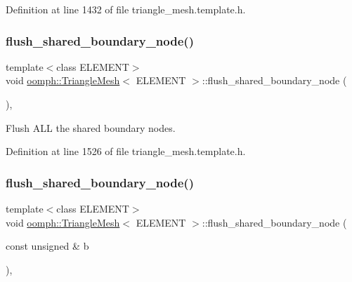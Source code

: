 Definition at line 1432 of file triangle\+\_\+mesh.\+template.\+h.

\mbox{\label{classoomph_1_1TriangleMesh_addbb476c72cce6f9d190d6bc026edbf0}} 
\subsubsection{\texorpdfstring{flush\+\_\+shared\+\_\+boundary\+\_\+node()}{flush\_shared\_boundary\_node()}\hspace{0.1cm}{\footnotesize\ttfamily [1/2]}}
{\footnotesize\ttfamily template$<$class E\+L\+E\+M\+E\+NT$>$ \\
void \hyperlink{classoomph_1_1TriangleMesh}{oomph\+::\+Triangle\+Mesh}$<$ E\+L\+E\+M\+E\+NT $>$\+::flush\+\_\+shared\+\_\+boundary\+\_\+node (\begin{DoxyParamCaption}{ }\end{DoxyParamCaption})\hspace{0.3cm}{\ttfamily [inline]}, {\ttfamily [protected]}}



Flush A\+LL the shared boundary nodes. 



Definition at line 1526 of file triangle\+\_\+mesh.\+template.\+h.

\mbox{\label{classoomph_1_1TriangleMesh_a23d348f815de7eee301395bbda9a0adf}} 
\subsubsection{\texorpdfstring{flush\+\_\+shared\+\_\+boundary\+\_\+node()}{flush\_shared\_boundary\_node()}\hspace{0.1cm}{\footnotesize\ttfamily [2/2]}}
{\footnotesize\ttfamily template$<$class E\+L\+E\+M\+E\+NT$>$ \\
void \hyperlink{classoomph_1_1TriangleMesh}{oomph\+::\+Triangle\+Mesh}$<$ E\+L\+E\+M\+E\+NT $>$\+::flush\+\_\+shared\+\_\+boundary\+\_\+node (\begin{DoxyParamCaption}\item[{const unsigned \&}]{b }\end{DoxyParamCaption})\hspace{0.3cm}{\ttfamily [inline]}, {\ttfamily [protected]}}



